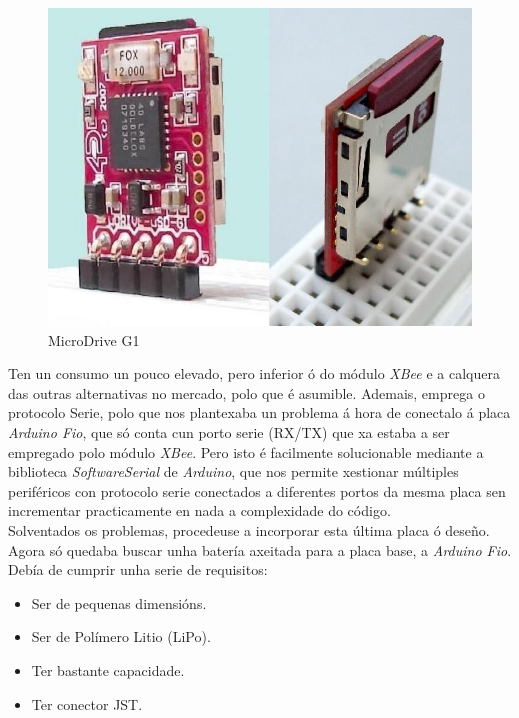  \begin{figure}[htbp]
   \centering
   \includegraphics[scale=0.3,keepaspectratio=true]{./imagenes/microdrive-g1.jpg}
   \caption{MicroDrive G1}
   \label{figura:MicroDriveG1}
  \end{figure}

  Ten un consumo un pouco elevado, pero inferior ó do módulo \textit{XBee} e a
  calquera das outras alternativas no mercado, polo que é asumible. Ademais,
  emprega o protocolo Serie, polo que nos plantexaba un problema á hora de
  conectalo á placa \textit{Arduino Fio}, que só conta cun porto serie (RX/TX)
  que xa estaba a ser empregado polo módulo \textit{XBee}. Pero isto é
  facilmente solucionable mediante a biblioteca \textit{SoftwareSerial} de
  \textit{Arduino}, que nos permite xestionar múltiples periféricos con
  protocolo serie conectados a diferentes portos da mesma placa sen incrementar
  practicamente en nada a complexidade do código. \\

  Solventados os problemas, procedeuse a incorporar esta última placa ó deseño.
  Agora só quedaba buscar unha batería axeitada para a placa base, a
  \textit{Arduino Fio}. Debía de cumprir unha serie de requisitos:

  \begin{itemize}
   \item Ser de pequenas dimensións.
   \item Ser de Polímero Litio (LiPo).
   \item Ter bastante capacidade.
   \item Ter conector JST.
  \end{itemize}

